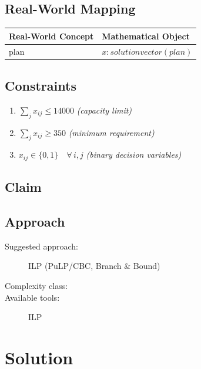\documentclass[11pt, a4paper]{article}
\begin{document}
\subsection{Real-World Mapping}

\begin{longtable}{ll}
\toprule
\textbf{Real-World Concept} & \textbf{Mathematical Object} \\
\midrule
\endhead
plan & $x: solution vector (plan)$ \\
\bottomrule
\end{longtable}

\subsection{Constraints}

\begin{enumerate}
  \item $\sum_j x_{ij} \le 14000$
  \hfill \textit{(capacity limit)}
  \item $\sum_j x_{ij} \ge 350$
  \hfill \textit{(minimum requirement)}
  \item $x_{ij} \in \{0, 1\} \quad \forall\, i, j$
  \hfill \textit{(binary decision variables)}
\end{enumerate}

\subsection{Claim}


\subsection{Approach}

\begin{description}
  \item[Suggested approach:] ILP (PuLP/CBC, Branch \& Bound)
  \item[Complexity class:] 
  \item[Available tools:] ILP
\end{description}
\section{Solution}
\end{document}

